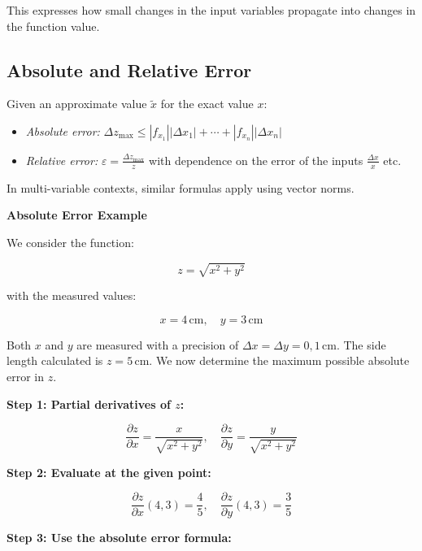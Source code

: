 This expresses how small changes in the input variables propagate into changes in the function value.


\subsection{Absolute and Relative Error}

Given an approximate value \( \tilde{x} \) for the exact value \( x \):

\begin{itemize}

    \item \emph{Absolute error:} \(\Delta z_{\max} \le |f_{x_1}||\Delta x_1| + \cdots + |f_{x_n}|
          |\Delta x_n| \)

    \item \emph{Relative error:} \( \varepsilon = \frac{\Delta z_{\max}}{z}\) with dependence on the error 
          of the inputs \(\frac{\Delta x}{x}\) etc.

\end{itemize}


In multi-variable contexts, similar formulas apply using vector norms.
\vspace{\baselineskip}

\textbf{Absolute Error Example}
\vspace{\baselineskip}

We consider the function:

\[
    z = \sqrt{x^2 + y^2}
\]

with the measured values:

\[
    x = 4 \, \text{cm}, \quad y = 3 \, \text{cm}
\]

Both \( x \) and \( y \) are measured with a precision of \( \Delta x = \Delta y = 0{,}1 \, \text{cm} \). 
The side length calculated is \( z = 5 \, \text{cm} \). We now determine the maximum possible absolute 
error in \( z \).

\textbf{Step 1: Partial derivatives of \( z \):}

\[
    \frac{\partial z}{\partial x} = \frac{x}{\sqrt{x^2 + y^2}}, \quad
    \frac{\partial z}{\partial y} = \frac{y}{\sqrt{x^2 + y^2}}
\]

\textbf{Step 2: Evaluate at the given point:}

\[
    \frac{\partial z}{\partial x}(4, 3) = \frac{4}{5}, \quad
    \frac{\partial z}{\partial y}(4, 3) = \frac{3}{5}
\]

\textbf{Step 3: Use the absolute error formula:}

